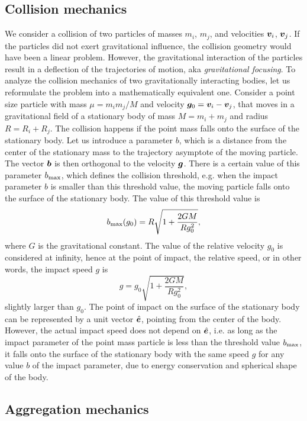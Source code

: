 \documentclass[aps,prl,preprint,groupedaddress,10pt]{revtex4-2}
\begin{document}
\subsection{Collision mechanics}
We consider a collision of two particles of masses $m_i$, $m_j$, and velocities $\vb*{v}_i$, 
$\vb*{v}_j$. If the particles did not exert gravitational influence, the collision 
geometry would have been a linear problem. However, the gravitational interaction of 
the particles result in a deflection of the trajectories of motion, aka 
\emph{gravitational focusing}. To analyze the collision mechanics of two gravitationally 
interacting bodies, let us reformulate the problem into a mathematically equivalent one.
Consider a point size particle with mass $\mu=m_im_j/M$ and velocity $\vb*{g}_0=\vb*{v}_i-\vb*{v}_j$, 
that moves in a gravitational field of a stationary body of mass $M=m_i+m_j$ and radius 
$R=R_i+R_j$. The collision happens if the point mass falls onto the surface of the 
stationary body. Let us introduce a parameter $b$, which is a distance from the center of 
the stationary mass to the trajectory asymptote of the moving particle. The vector $\vb*{b}$
is then orthogonal to the velocity $\vb*{g}$. There is a certain value of this parameter 
$b_{\mathrm{max}}$, which defines the collision threshold, e.g. when the impact parameter $b$
is smaller than this threshold value, the moving particle falls onto the surface of the 
stationary body. The value of this threshold value is
\begin{equation}
    \lmax{b}\pqty{g_0}=R\sqrt{1+\frac{2GM}{Rg_0^2}},
\end{equation}
where $G$ is the gravitational constant. The value of the relative velocity $g_0$ is 
considered at infinity, hence at the point of impact, the relative speed, or in other 
words, the impact speed $g$ is 
\begin{equation}
    g = g_0\sqrt{1+\frac{2GM}{Rg_0^2}},
\end{equation}
slightly larger than $g_0$. The point of impact on the surface of the stationary body 
can be represented by a unit vector $\hat{\vb*{e}}$, pointing from the center of the body. However,
the actual impact speed does not depend on $\hat{\vb*{e}}$, i.e. as long as the impact parameter 
of the point mass particle is less than the threshold value $b_{\mathrm{max}}$, 
it falls onto the surface of the stationary body with the same speed $g$ 
for any value $b$ of the impact parameter, due to energy conservation and spherical shape
of the body.

\subsection{Aggregation mechanics}




    
\end{document}

